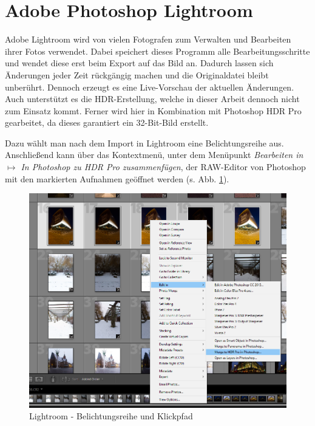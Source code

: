 \documentclass[liststotoc,bibtotoc,fontsize=14pt,]{scrreprt}
\begin{document}
	
	\section{Adobe Photoshop Lightroom}
	\label{sec:photoshop}
		Adobe Lightroom wird von vielen Fotografen zum Verwalten und Bearbeiten ihrer Fotos verwendet. Dabei speichert dieses Programm alle Bearbeitungsschritte und wendet diese erst beim Export auf das Bild an. Dadurch lassen sich Änderungen jeder Zeit rückgängig machen und die Originaldatei bleibt unberührt. Dennoch erzeugt es eine Live-Vorschau der aktuellen Änderungen. Auch unterstützt es die HDR-Erstellung, welche in dieser Arbeit dennoch nicht zum Einsatz kommt. Ferner wird hier in Kombination mit Photoshop HDR Pro gearbeitet, da dieses garantiert ein 32-Bit-Bild erstellt.
		
		\bigskip
		Dazu wählt man nach dem Import in Lightroom eine Belichtungsreihe aus. Anschließend kann über das Kontextmenü, unter dem Menüpunkt \textit{Bearbeiten in $\mapsto$ In Photoshop zu HDR Pro zusammenfügen}, der RAW-Editor von Photoshop mit den markierten Aufnahmen geöffnet werden (s. Abb. \ref{img:light_1}).
		
		\bigskip
		\begin{figure}[H]
			\includegraphics[width=\linewidth]{img/lightroom1.png}
			\caption{Lightroom - Belichtungsreihe und Klickpfad}
			\label{img:light_1}
		\end{figure}
	
\end{document}
